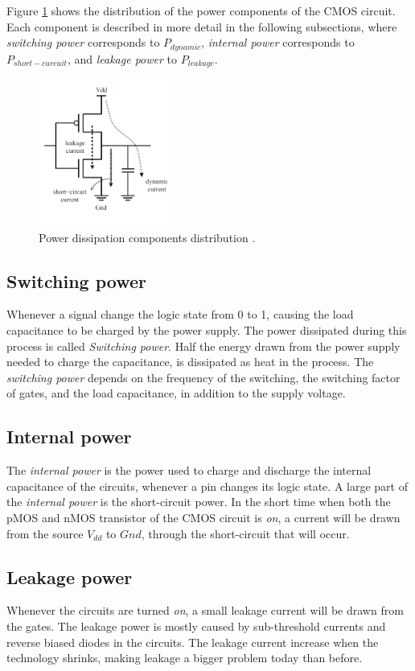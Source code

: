 Figure \cref{fig:powerdisscmos} shows the distribution of the power components of the CMOS circuit. Each component is described in more detail in the following subsections, where \textit{switching power} corresponds to $P_{dynamic}$, \textit{internal power} corresponds to $P_{short-curcuit}$, and \textit{leakage power} to $P_{leakage}$.
\begin{figure}[hbpt]
\centering
\includegraphics[width=0.4\textwidth]{../figs/PowerDissipation.png}
\caption{\label{fig:powerdisscmos}Power dissipation components distribution \cite{panda2010power}.}
\end{figure}

\subsection{Switching power}
Whenever a signal change the logic state from 0 to 1, causing the load capacitance to be charged by the power supply. The power dissipated during this process is called \textit{Switching power}. Half the energy drawn from the power supply needed to charge the capacitance, is dissipated as heat in the process. The \textit{switching power} depends on the frequency of the switching, the switching factor of gates, and the load capacitance, in addition to the supply voltage. 

\subsection{Internal power}
The \textit{internal power} is the power used to charge and discharge the internal capacitance of the circuits, whenever a pin changes its logic state. A large part of the \textit{internal power} is the short-circuit power. In the short time when both the pMOS and nMOS transistor of the CMOS circuit is \textit{on}, a current will be drawn from the source $V_{dd}$ to $Gnd$, through the short-circuit that will occur. 

\subsection{Leakage power}
Whenever the circuits are turned \textit{on}, a small leakage current will be drawn from the gates. The leakage power is mostly caused by sub-threshold currents and reverse biased diodes in the circuits. The leakage current increase when the technology shrinks, making leakage a bigger problem today than before. 

